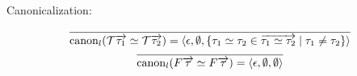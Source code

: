 Canonicalization:

\begin{gather*}
  \infer{\mathrm{canon}_l(\mathcal{T} \overrightarrow{\tau_1} \simeq \mathcal{T} \overrightarrow{\tau_2}) = \langle \epsilon, \emptyset, \{\tau_1 \simeq \tau_2 \in \overrightarrow{\tau_1 \simeq \tau_2} \mid \tau_1 \neq \tau_2\}\rangle}{}
  \\
  \infer{\mathrm{canon}_l(F \overrightarrow{\tau} \simeq F \overrightarrow{\tau}) = \langle\epsilon, \emptyset, \emptyset\rangle}{}
\end{gather*}
